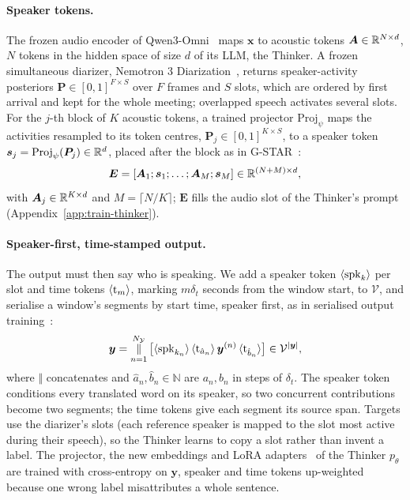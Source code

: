 \paragraph{Speaker tokens.} The frozen audio encoder of Qwen3-Omni~\citep{xu2025qwen3omni} maps $\bm{x}$ to acoustic
tokens $\bm{A}\in\mathbb{R}^{N\times d}$, $N$ tokens in the hidden space of size $d$ of its LLM, the Thinker. A frozen
simultaneous diarizer, Nemotron 3 Diarization~\citep{medennikov2026nemotron}, returns speaker-activity posteriors
$\bm{P}\in[0,1]^{F\times S}$ over $F$ frames and $S$ slots, which are ordered by first arrival and kept for the whole
meeting; overlapped speech activates several slots. For the $j$-th block of $K$ acoustic tokens, a trained projector
$\mathrm{Proj}_\psi$ maps the activities resampled to its token centres, $\bm{P}_j\in[0,1]^{K\times S}$, to a speaker
token $\bm{s}_j=\mathrm{Proj}_\psi(\bm{P}_j)\in\mathbb{R}^{d}$, placed after the block as in G-STAR~\citep{peng2026gstar}:
\begin{equation}
\bm{E}=[\bm{A}_1;\bm{s}_1;\dots;\bm{A}_M;\bm{s}_M]\in\mathbb{R}^{(N+M)\times d},
\label{eq:interleave}
\end{equation}
with $\bm{A}_j\in\mathbb{R}^{K\times d}$ and $M=\lceil N/K\rceil$; $\bm{E}$ fills the audio slot of the Thinker's prompt
(Appendix~\ref{app:train-thinker}).

\paragraph{Speaker-first, time-stamped output.} The output must then say who is speaking. We add a speaker token
$\langle\mathrm{spk}_{k}\rangle$ per slot and time tokens $\langle\mathrm{t}_{m}\rangle$, marking $m\delta_t$ seconds from the window start, to $\mathcal{V}$, and
serialise a window's segments by start time, speaker first, as in serialised output training~\citep{kanda2020sot}:
\begin{equation}
\bm{y}=\mathop{\Vert}_{n=1}^{N_\mathcal{Y}}\big[\langle\mathrm{spk}_{k_n}\rangle\,\langle\mathrm{t}_{\hat a_n}\rangle\,\bm{y}^{(n)}\,\langle\mathrm{t}_{\hat b_n}\rangle\big]\in\mathcal{V}^{|\bm{y}|},
\label{eq:serial}
\end{equation}
where $\Vert$ concatenates and $\hat a_n,\hat b_n\in\mathbb{N}$ are $a_n,b_n$ in steps of $\delta_t$. The speaker token
conditions every translated word on its speaker, so two concurrent contributions become two segments; the time tokens
give each segment its source span. Targets use the diarizer's slots (each reference speaker is mapped to the slot most
active during their speech), so the Thinker learns to copy a slot rather than invent a label. The projector, the new
embeddings and LoRA adapters~\citep{hu2022lora} of the Thinker $p_\theta$ are trained with cross-entropy on $\bm{y}$,
speaker and time tokens up-weighted because one wrong label misattributes a whole sentence.

